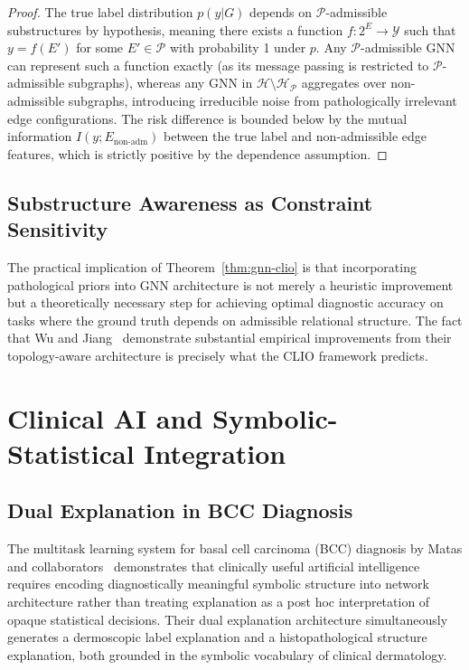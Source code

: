 \documentclass[11pt, oneside]{article}
\numberwithin{equation}{section}
\theoremstyle{rsvpstyle}
\theoremstyle{remark}
\begin{document}
\begin{proof}
The true label distribution $p(y|G)$ depends on $\mathcal{P}$-admissible substructures
by hypothesis, meaning there exists a function $f : 2^E \to \mathcal{Y}$ such that
$y = f(E')$ for some $E' \in \mathcal{P}$ with probability 1 under $p$. Any
$\mathcal{P}$-admissible GNN can represent such a function exactly (as its message
passing is restricted to $\mathcal{P}$-admissible subgraphs), whereas any GNN in
$\mathcal{H} \setminus \mathcal{H}_\mathcal{P}$ aggregates over non-admissible subgraphs,
introducing irreducible noise from pathologically irrelevant edge configurations.
The risk difference is bounded below by the mutual information $I(y; E_\text{non-adm})$
between the true label and non-admissible edge features, which is strictly positive
by the dependence assumption.
\end{proof}

\subsection{Substructure Awareness as Constraint Sensitivity}

The practical implication of Theorem~\ref{thm:gnn-clio} is that incorporating
pathological priors into GNN architecture is not merely a heuristic improvement
but a theoretically necessary step for achieving optimal diagnostic accuracy on
tasks where the ground truth depends on admissible relational structure. The fact
that Wu and Jiang~\cite{Wu2026GNN} demonstrate substantial empirical improvements
from their topology-aware architecture is precisely what the CLIO framework predicts.

\section{Clinical AI and Symbolic-Statistical Integration}

\subsection{Dual Explanation in BCC Diagnosis}

The multitask learning system for basal cell carcinoma (BCC) diagnosis by Matas and
collaborators~\cite{Matas2026BCC} demonstrates that clinically useful artificial
intelligence requires encoding diagnostically meaningful symbolic structure into
network architecture rather than treating explanation as a post hoc interpretation
of opaque statistical decisions. Their dual explanation architecture simultaneously
generates a dermoscopic label explanation and a histopathological structure explanation,
both grounded in the symbolic vocabulary of clinical dermatology.
\end{document}
